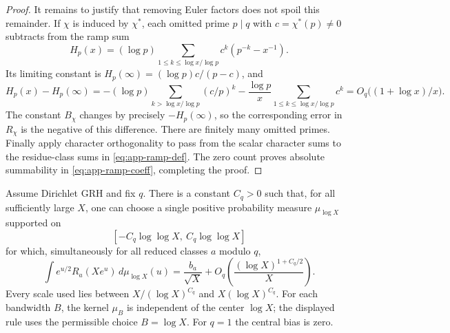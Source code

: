 \begin{proof}
It remains to justify that removing Euler factors does not spoil this
remainder.  If $\chi$ is induced by $\chi^*$, each omitted prime $p\mid q$
with $c=\chi^*(p)\ne0$ subtracts from the ramp sum
\[
 H_p(x)=(\log p)\sum_{1\le k\le\log x/\log p}
                         c^k(p^{-k}-x^{-1}).
\]
Its limiting constant is
$H_p(\infty)=(\log p)c/(p-c)$, and
\[
 H_p(x)-H_p(\infty)
 =-(\log p)\sum_{k>\log x/\log p}(c/p)^k
   -\frac{\log p}{x}\sum_{1\le k\le\log x/\log p}c^k
 =O_q\bigl((1+\log x)/x\bigr).
\]
The constant $B_\chi$ changes by precisely $-H_p(\infty)$, so the
corresponding error in $R_\chi$ is the negative of this difference.
There are finitely many omitted primes.  Finally apply character
orthogonality to pass from the scalar character sums to the residue-class
sums in \eqref{eq:app-ramp-def}.  The zero count proves absolute
summability in \eqref{eq:app-ramp-coeff}, completing the proof.
\end{proof}

\begin{theorem}
\label{thm:app-arithmetic}
Assume Dirichlet GRH and fix $q$.  There is a constant $C_q>0$ such that,
for all sufficiently large $X$, one can choose a single positive probability
measure $\mu_{\log X}$ supported on
\[
 [-C_q\log\log X,\ C_q\log\log X]
\]
for which, simultaneously for all reduced classes $a$ modulo $q$,
\begin{equation}\label{eq:app-polylog-error}
 \int e^{u/2}R_a(Xe^u)\,d\mu_{\log X}(u)
 =\frac{b_a}{\sqrt X}
   +O_q\!\left(\frac{(\log X)^{1+C_q/2}}{X}\right).
\end{equation}
Every scale used lies between
$X/(\log X)^{C_q}$ and $X(\log X)^{C_q}$.
For each bandwidth $B$, the kernel $\mu_B$ is independent of the center
$\log X$; the displayed rule uses the permissible choice $B=\log X$.
For $q=1$ the central bias is zero.
\end{theorem}

